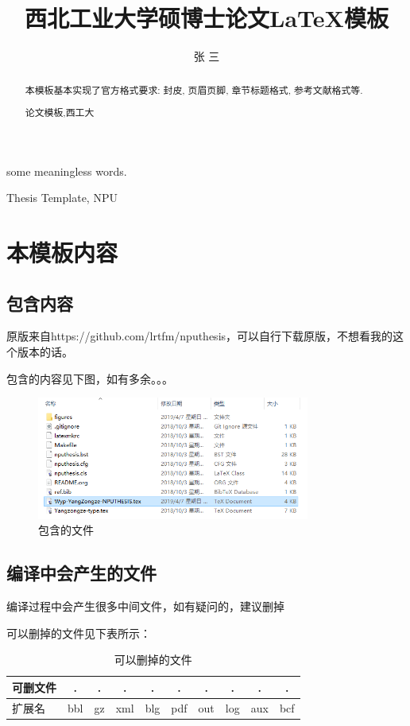 \documentclass[twoside, workbib, UTF8, phd]{nputhesis}
\title[\LaTeX\ Template for Thesis of NPU]{西北工业大学硕博士论文\LaTeX 模板}
\author[San Zhang]{张\,\,三}
\begin{document}
\makecover    %
\frontmatter  %

\begin{abstract}
  本模板基本实现了官方格式要求: 封皮, 页眉页脚, 章节标题格式, 参考文献格式等.
  \begin{keywords}
    论文模板,西工大
  \end{keywords}
\end{abstract}

\begin{Abstract}
   some meaningless words.
  \begin{Keywords}
    Thesis Template, NPU
  \end{Keywords}
\end{Abstract}

\tableofcontents    %
\printnomenclature  %
\mainmatter         %

\chapter{本模板内容}

\section{包含内容}
原版来自https://github.com/lrtfm/nputhesis，可以自行下载原版，不想看我的这个版本的话。\par\par
包含的内容见下图，如有多余。。。
\begin{figure}[htbp]
    \centering
    \includegraphics[width=0.8\textwidth]{figures/fig-files.png}
    \caption{包含的文件}
\end{figure}

\section{编译中会产生的文件}
编译过程中会产生很多中间文件，如有疑问的，建议删掉\par
可以删掉的文件见下表所示：
\begin{table}[htbp]
  \caption{可以删掉的文件}
  \centering
  \begin{tabular}{lccccccccc}
    \toprule
     可删文件 & .& .& .& .& .& .& .& .& . \\
    \midrule
    扩展名 &bbl&gz&xml&blg&pdf&out&log&aux&bcf\\
    \bottomrule
  \end{tabular}
\end{table}
\end{document}
